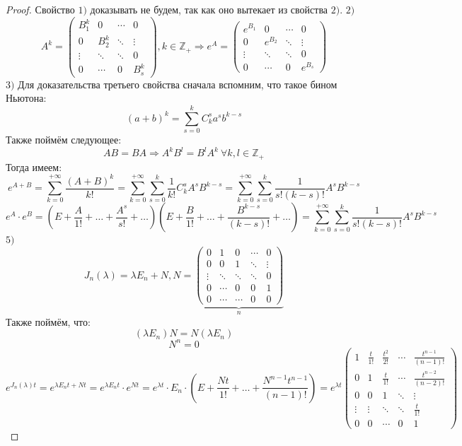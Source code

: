 \documentclass[11pt]{article}
\begin{document}
\begin{proof}
    Свойство $1)$ доказывать не будем, так как оно вытекает из свойства $2)$. 
    $2)$ \[ A^k = 
    \begin{pmatrix}
            \boxed{B_1^k} & 0 & \cdots & 0 \\
            0 & \boxed{B_2^k} & \ddots & \vdots \\
            \vdots & \ddots & \ddots & 0 \\
            0 & \cdots & 0 & \boxed{B_s^k}
        \end{pmatrix} , k\in \mathbb{Z}_+
    \Rightarrow e^A = 
    \begin{pmatrix}
        e^{B_1} & 0 & \cdots & 0 \\
        0 & e^{B_2} & \ddots & \vdots \\
        \vdots & \ddots & \ddots & 0 \\
        0 & \cdots & 0 & e^{B_s}
    \end{pmatrix} \] 
    $3)$ Для доказательства третьего свойства сначала вспомним, что такое бином Ньютона:
    \[ (a+b)^k = \sum_{s=0}^{k} C_k^s a^s b^{k-s} \] 
    Также поймём следующее:
    \[ AB = BA \Rightarrow A^kB^l = B^lA^k \ \forall k,l \in \mathbb{Z}_+ \]   
    Тогда имеем:
    \[ e^{A+B} = \sum_{k=0}^{+\infty} \frac{(A+B)^k}{k!} = \sum_{k=0}^{+\infty} \sum_{s=0}^{k} \frac{1}{k!} C_k^s A^s B^{k-s} = \sum_{k=0}^{+\infty} \sum_{s=0}^{k} \frac{1}{s! (k-s)!} A^sB^{k-s} \]   
    \[ e^A \cdot e^B = (E + \frac{A}{1!} + \ldots + \frac{A^s}{s!}+ \ldots ) (E+ \frac{B}{1!} + \ldots + \frac{B^{k-s}}{(k-s)!} + \ldots) = \sum_{k=0}^{+\infty} \sum_{s=0}^{k} \frac{1}{s! (k-s)!} A^s B^{k-s} \] 
    $5)$ \[ J_n(\lambda) = \lambda E_n + N , N = \underbrace{
        \begin{pmatrix}
            0 & 1 & 0 & \cdots & 0 \\
            0 & 0 & 1 & \ddots & \vdots \\
            \vdots & \ddots & \ddots & \ddots & 0 \\
            0 & \cdots & 0 & 0 & 1 \\
            0 & \cdots & \cdots & 0 & 0
        \end{pmatrix}
        }_{n}  
    \]
    Также поймём, что:
    \[ (\lambda E_n) N = N(\lambda E_n) \] 
    \[ N^n =0 \] 
    \[ e^{J_n(\lambda) t} = e^{\lambda E_n t+ Nt} = e^{\lambda E_n t} \cdot e^{Nt} = e^{\lambda t} \cdot E_n \cdot ( E+ \frac{Nt}{1!} + \ldots + \frac{N^{n-1}t^{n-1}}{(n-1)!}) = e^{\lambda t}
    \begin{pmatrix}
            1 & \frac{t}{1!} & \frac{t^2}{2!} & \cdots
            & \frac{t^{n-1}}{(n-1)!} \\
            0 & 1 & \frac{t}{1!} & \cdots
            & \frac{t^{n-2}}{(n-2)!} \\
            0 & 0 & 1 & \ddots & \vdots \\
            \vdots & \vdots & \ddots & \ddots & \frac{t}{1!} \\
            0 & 0 & \cdots & 0 & 1
        \end{pmatrix} \] 

\end{proof}
\end{document}
